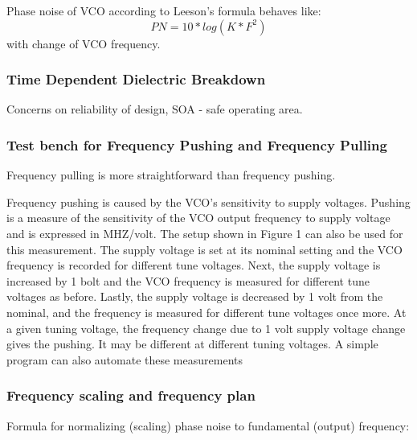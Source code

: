 Phase noise of VCO according to Leeson's formula behaves like:
\begin{equation}
	PN = 10 * log(K* F^2)
\end{equation}
with change of VCO frequency.

\begin{question}
	
\end{question}

\subsubsection*{Time Dependent Dielectric Breakdown}

Concerns on reliability of design, SOA - safe operating area.

\subsubsection*{Test bench for Frequency Pushing and Frequency Pulling}

Frequency pulling is more straightforward than frequency pushing. 

\begin{info}
	Frequency pushing is caused by the VCO's sensitivity to supply voltages. Pushing is a measure of the sensitivity of the VCO output frequency to supply voltage and is expressed in MHZ/volt. The setup	shown in Figure 1 can also be used for this measurement. The supply voltage is set at its nominal	setting and the VCO frequency is recorded for different tune voltages. Next, the supply voltage is increased by 1 bolt and the VCO frequency is measured for different tune voltages as before. Lastly, the supply voltage is decreased by 1 volt from the nominal, and the frequency is measured for different tune voltages once more. At a given tuning voltage, the frequency change due to 1 volt supply voltage change gives the pushing. It may be different at different tuning voltages. A simple program can also automate these measurements
		
\end{info}


\subsubsection*{Frequency scaling and frequency plan}

Formula for normalizing (scaling) phase noise to fundamental (output) frequency:

